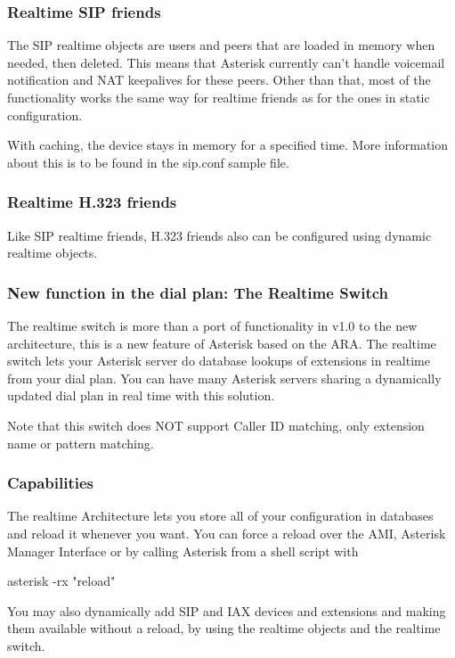\subsubsection{Realtime SIP friends}

The SIP realtime objects are users and peers that are loaded in memory 
when needed, then deleted. This means that Asterisk currently can't handle
voicemail notification and NAT keepalives for these peers. Other than that,
most of the functionality works the same way for realtime friends as for
the ones in static configuration.

With caching, the device stays in memory for a specified time. More 
information about this is to be found in the sip.conf sample file.

\subsubsection{Realtime H.323 friends}

Like SIP realtime friends, H.323 friends also can be configured using
dynamic realtime objects.

\subsubsection{New function in the dial plan: The Realtime Switch}

The realtime switch is more than a port of functionality in v1.0 to the
new architecture, this is a new feature of Asterisk based on the 
ARA. The realtime switch lets your Asterisk server do database lookups
of extensions in realtime from your dial plan. You can have many Asterisk
servers sharing a dynamically updated dial plan in real time with this
solution.

Note that this switch does NOT support Caller ID matching, only
extension name or pattern matching.

\subsubsection{Capabilities}

The realtime Architecture lets you store all of your configuration in
databases and reload it whenever you want. You can force a reload over
the AMI, Asterisk Manager Interface or by calling Asterisk from a 
shell script with 

  asterisk -rx "reload"

You may also dynamically add SIP and IAX devices and extensions 
and making them available without a reload, by using the realtime
objects and the realtime switch.

